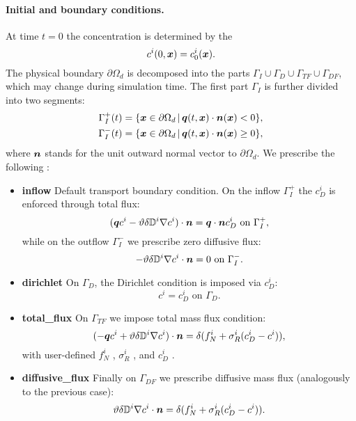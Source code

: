 \paragraph{Initial and boundary conditions.}
At time $t=0$ the concentration is determined by the 
$$ c^i(0,\mathbf{\boldsymbol{x}}) = c^i_0(\mathbf{\boldsymbol{x}}). $$
The physical boundary $\partial\Omega_d$ is decomposed into the parts $\Gamma_I\cup\Gamma_D\cup\Gamma_{TF}\cup\Gamma_{DF}$, which may change during simulation time.
The first part $\Gamma_I$ is further divided into two segments:
\begin{align*}
\Gamma_I^+(t) &= \{\mathbf{\boldsymbol{x}}\in \partial\Omega_d\,|\, \mathbf{\boldsymbol{q}}(t,\mathbf{\boldsymbol{x}})\cdot\mathbf{\boldsymbol{n}}(\mathbf{\boldsymbol{x}})<0\},\\
\Gamma_I^-(t) &= \{\mathbf{\boldsymbol{x}}\in \partial\Omega_d\,|\, \mathbf{\boldsymbol{q}}(t,\mathbf{\boldsymbol{x}})\cdot\mathbf{\boldsymbol{n}}(\mathbf{\boldsymbol{x}})\ge 0\},
\end{align*}
where $\mathbf{\boldsymbol{n}}$ stands for the unit outward normal vector to $\partial\Omega_d$.
We prescribe the following :
\begin{itemize}
\item \textbf{inflow} Default transport boundary condition. On the inflow $\Gamma_I^+$ the  $c_D^i$  is enforced through total flux:
$$ (\mathbf{\boldsymbol{q}} c^i - \vartheta\delta{{\mathbb{D}}}^i\nabla c^i)\cdot\mathbf{\boldsymbol{n}} = \mathbf{\boldsymbol{q}}\cdot\mathbf{\boldsymbol{n}} c_D^i \mbox{ on }\Gamma_I^+, $$
while on the outflow $\Gamma_I^-$ we prescribe zero diffusive flux:
$$ -\vartheta\delta{{\mathbb{D}}}^i\nabla c^i\cdot\mathbf{\boldsymbol{n}} = 0 \mbox{ on }\Gamma_I^-. $$
\item \textbf{dirichlet} On $\Gamma_D$, the Dirichlet condition is imposed via  $c_D^i$:
$$ c^i = c^i_D \mbox{ on }\Gamma_D. $$
\item \textbf{total\_flux}
On $\Gamma_{TF}$ we impose total mass flux condition:
$$ (-\mathbf{\boldsymbol{q}} c^i + \vartheta\delta{{\mathbb{D}}}^i\nabla c^i)\cdot\mathbf{\boldsymbol{n}} = \delta(f^i_N + \sigma^i_R(c^i_D-c^i)), $$
with user-defined  $f^i_N$ ,
 $\sigma^i_R$ ,
and  $c^i_D$ .
\item \textbf{diffusive\_flux} Finally on $\Gamma_{DF}$ we prescribe diffusive mass flux (analogously to the previous case):
$$ \vartheta\delta{{\mathbb{D}}}^i\nabla c^i\cdot\mathbf{\boldsymbol{n}} = \delta(f^i_N+\sigma^i_R(c^i_D-c^i)). $$
\end{itemize}
